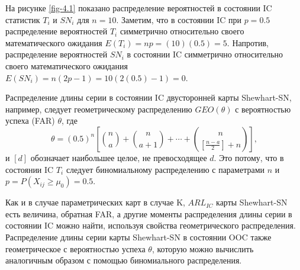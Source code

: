 На рисунке \ref{fig-4.1} показано распределение вероятностей в состоянии IC статистик \(T_i\) и \(SN_i\) для \(n = 10\). Заметим, что в состоянии IC при \(p = 0.5\) распределение вероятностей \(T_i\) симметрично относительно своего математического ожидания \(E(T_i) = np = (10)(0.5) = 5\). Напротив, распределение вероятностей \(SN_i\) в состоянии IC симметрично относительно своего математического ожидания \(E(SN_i) = n(2p - 1) = 10(2(0.5) - 1) = 0\).

Распределение длины серии в состоянии IC двусторонней карты Shewhart-SN, например, следует геометрическому распределению \(GEO(\theta)\) с вероятностью успеха (FAR) \(\theta\), где
\[
\theta = (0.5)^n \left[ \binom{n}{a} + \binom{n}{a+1} + \cdots + \binom{n}{\left[\frac{n-a}{2}\right] + n} \right],
\]
и \([d]\) обозначает наибольшее целое, не превосходящее \(d\). Это потому, что в состоянии IC \(T_i\) следует биномиальному распределению с параметрами \(n\) и \(p = P(X_{ij} \ge \mu_0) = 0.5\).

Как и в случае параметрических карт в случае K, \(ARL_{IC}\) карты Shewhart-SN есть величина, обратная FAR, а другие моменты распределения длины серии в состоянии IC можно найти, используя свойства геометрического распределения. Распределение длины серии карты Shewhart-SN в состоянии OOC также геометрическое с вероятностью успеха \(\theta\), которую можно вычислить аналогичным образом с помощью биномиального распределения.

